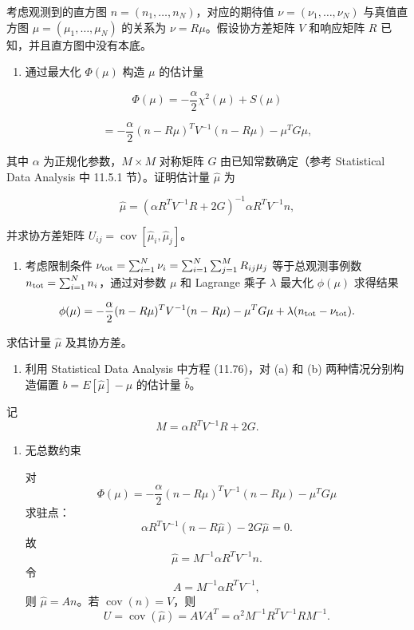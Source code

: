 \begin{question}
考虑观测到的直方图 \(n=(n_1,\ldots,n_N)\)，对应的期待值
\(\nu=(\nu_1,\ldots,\nu_N)\) 与真值直方图 \(\mu=(\mu_1,\ldots,\mu_N)\)
的关系为 \(\nu=R\mu\)。假设协方差矩阵 \(V\) 和响应矩阵 \(R\)
已知，并且直方图中没有本底。

\begin{enumerate}
\item
  通过最大化 \(\Phi(\mu)\) 构造 \(\mu\) 的估计量
\end{enumerate}

\[
\Phi(\mu)=-\frac{\alpha}{2}\chi^2(\mu)+S(\mu)
\]

\[
=-\frac{\alpha}{2}(n-R\mu)^T V^{-1}(n-R\mu)-\mu^T G\mu,
\]

其中 \(\alpha\) 为正规化参数，\(M\times M\) 对称矩阵 \(G\)
由已知常数确定（参考 Statistical Data Analysis 中 11.5.1
节）。证明估计量 \(\hat\mu\) 为

\[
\hat\mu=(\alpha R^T V^{-1}R+2G)^{-1}\alpha R^T V^{-1}n,
\]

并求协方差矩阵 \(U_{ij}=\operatorname{cov}[\hat\mu_i,\hat\mu_j]\)。

\begin{enumerate}[start=2]
\item
  考虑限制条件
  \(\nu_{\rm tot}=\sum_{i=1}^{N}\nu_i=\sum_{i=1}^{N}\sum_{j=1}^{M}R_{ij}\mu_j\)
  等于总观测事例数 \(n_{\rm tot}=\sum_{i=1}^{N}n_i\)，通过对参数 \(\mu\)
  和 Lagrange 乘子 \(\lambda\) 最大化 \(\phi(\mu)\) 求得结果
\end{enumerate}

\[
\phi(\mu)=-\frac{\alpha}{2}(n-R\mu)^T V^{-1}(n-R\mu)-\mu^T G\mu+\lambda(n_{\rm tot}-\nu_{\rm tot}).
\]

求估计量 \(\hat\mu\) 及其协方差。

\begin{enumerate}[start=3]
\item
  利用 Statistical Data Analysis 中方程 (11.76)，对 (a) 和 (b)
  两种情况分别构造偏置 \(b=E[\hat\mu]-\mu\) 的估计量 \(\hat b\)。
\end{enumerate}
\begin{solution}
记
\[
M=\alpha R^T V^{-1}R+2G.
\]

\begin{enumerate}
\item 无总数约束

对
\[
\Phi(\mu)=
-\frac\alpha2(n-R\mu)^TV^{-1}(n-R\mu)-\mu^TG\mu
\]
求驻点：
\[
\alpha R^TV^{-1}(n-R\hat\mu)-2G\hat\mu=0.
\]
故
\[
\hat\mu=M^{-1}\alpha R^TV^{-1}n.
\]
令
\[
A=M^{-1}\alpha R^TV^{-1},
\]
则 \(\hat\mu=An\)。若 \(\operatorname{cov}(n)=V\)，则
\[
U=\operatorname{cov}(\hat\mu)=AVA^T
=\alpha^2M^{-1}R^TV^{-1}R M^{-1}.
\]


\end{enumerate}
\end{solution}
\end{question}
